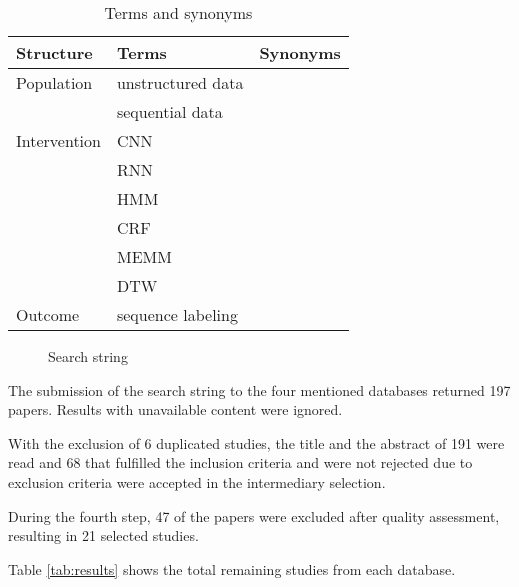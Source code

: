 \begin{table*}[!ht]
    \centering
    \begin{tabular}{ l  l  l }
      Structure 	& Terms 		& Synonyms \\
      \hline\hline
      Population 	& unstructured data & \\   
                    & sequential data & \\
      \hline
      Intervention 	& CNN & \\
                    & RNN & \\
                    & HMM & \\
                    & CRF & \\
                    & MEMM & \\
                    & DTW & \\
      \hline
      Outcome 		& sequence labeling &\\
      \hline
    \end{tabular}
    \caption{Terms and synonyms}
    \label{tab:terms}
\end{table*}

\begin{figure}[!ht]
  \centering
  \caption{Search string}
  \label{fig:searchstring}
\end{figure}
	
The submission of the search string to the four mentioned databases returned 197 papers.
Results with unavailable content were ignored.

With the exclusion of 6 duplicated studies, the title and the abstract of 191 were read and 68 that fulfilled the inclusion criteria and were not rejected due to exclusion criteria were accepted in the intermediary selection.

During the fourth step, 47 of the papers were excluded after quality assessment, resulting in 21 selected studies.

Table 
\ref{tab:results}
shows the total remaining studies from each database.


